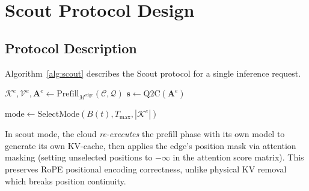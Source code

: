 \documentclass[journal]{IEEEtran}
\begin{document}
\section{Scout Protocol Design}
\label{sec:protocol}

\subsection{Protocol Description}

Algorithm~\ref{alg:scout} describes the Scout protocol for a single inference request.

\begin{algorithm}[t]
\caption{Scout Protocol}
\label{alg:scout}
\SetAlgoLined
{}

$\mathcal{K}^e, \mathcal{V}^e, \mathbf{A}^e \leftarrow \text{Prefill}_{M^{\text{edge}}}(\mathcal{C}, \mathcal{Q})$\;
$\mathbf{s} \leftarrow \text{Q2C}(\mathbf{A}^e)$ 

$\text{mode} \leftarrow \text{SelectMode}(B(t), T_{\max}, |\mathcal{K}^e|)$\;

\end{algorithm}

In scout mode, the cloud \emph{re-executes} the prefill phase with its own model to generate its own KV-cache, then applies the edge's position mask via attention masking (setting unselected positions to $-\infty$ in the attention score matrix).
This preserves RoPE positional encoding correctness, unlike physical KV removal which breaks position continuity.
\end{document}
